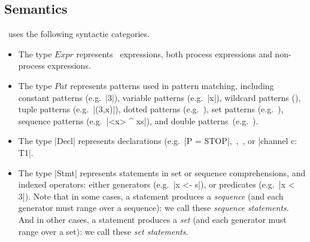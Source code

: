 \subsection{Semantics}

\CSPm\ uses the following syntactic categories.
%
\begin{itemize}
\item The type $Expr$ represents \CSPm\ expressions, both process expressions
  and non-process expressions.

\item The type $Pat$ represents  patterns used in pattern matching, including
  constant patterns (e.g.~|3|), variable patterns (e.g.~|x|), wildcard
  patterns (\CSPM{\_}), tuple patterns (e.g.~|(3,x)|), dotted patterns
  (e.g.~), set patterns (e.g.~), sequence patterns
  (e.g.~|<x> ^ xs|), and double patterns~(e.g.~).

\item The type |Decl| represents  declarations (e.g.~|P = STOP|,\, ,\, , or |channel c: T1|.

\item The type |Stmt| represents statements in set or sequence comprehensions,
  and indexed operators: either generators (e.g.~|x <- s|), or predicates
  (e.g.~|x < 3|).  Note that in some cases, a statement produces a
  \emph{sequence} (and each generator must range over a sequence): we call
  these \emph{sequence statements}.  And in other cases, a statement produces
  a \emph{set} (and each generator must range over a set): we call these
  \emph{set statements}.
\end{itemize}


